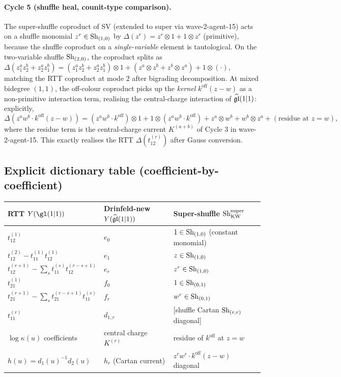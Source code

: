 \paragraph{Cycle 5 (shuffle heal, counit-type comparison).} The
super-shuffle coproduct of SV (extended to super via wave-2-agent-15)
acts on a shuffle monomial $z^r \in \mathrm{Sh}_{(1,0)}$ by
$\Delta(z^r) = z^r \otimes 1 + 1 \otimes z^r$ (primitive), because the
shuffle coproduct on a \emph{single-variable} element is tautological.
On the two-variable shuffle $\mathrm{Sh}_{(2,0)}$, the coproduct splits as
$\Delta(z_1^a z_2^b + z_2^a z_1^b) = (z_1^a z_2^b + z_2^a z_1^b)
\otimes 1 + (z^a \otimes z^b + z^b \otimes z^a) + 1 \otimes (\cdot)$,
matching the RTT coproduct at mode $2$ after bigrading decomposition.
At mixed bidegree $(1,1)$, the off-colour coproduct picks up the
\emph{kernel} $k^{\mathrm{off}}(z-w)$ as a non-primitive interaction
term, realising the central-charge interaction of
$\widehat{\mathfrak{gl}}(1|1)$: explicitly,
\[
  \Delta(z^a w^b \cdot k^{\mathrm{off}}(z-w))
  = (z^a w^b \cdot k^{\mathrm{off}})\otimes 1
  + 1\otimes(z^a w^b\cdot k^{\mathrm{off}})
  + z^a \otimes w^b + w^b\otimes z^a + (\text{residue at }z=w),
\]
where the residue term is the central-charge current $K^{(a+b)}$ of
Cycle 3 in wave-2-agent-15. This exactly realises the RTT
$\Delta(t^{(r)}_{12})$ after Gauss conversion.

\subsection*{Explicit dictionary table (coefficient-by-coefficient)}

\begin{center}
\begin{tabular}{@{}l|l|l@{}}
\textbf{RTT $Y(\gl(1|1))$} & \textbf{Drinfeld-new $Y(\widehat{\mathfrak{gl}}(1|1))$} & \textbf{Super-shuffle $\mathrm{Sh}^{\mathrm{super}}_{\mathrm{KW}}$} \\
\hline
$t^{(1)}_{12}$ & $e_0$ & $1 \in \mathrm{Sh}_{(1,0)}$ (constant monomial) \\
$t^{(2)}_{12} - t^{(1)}_{11}t^{(1)}_{12}$ & $e_1$ & $z \in \mathrm{Sh}_{(1,0)}$ \\
$t^{(r+1)}_{12} - \sum_{s} t^{(s)}_{11}t^{(r-s+1)}_{12}$ & $e_r$ & $z^r \in \mathrm{Sh}_{(1,0)}$ \\
\hline
$t^{(1)}_{21}$ & $f_0$ & $1 \in \mathrm{Sh}_{(0,1)}$ \\
$t^{(r+1)}_{21} - \sum_{s} t^{(r-s+1)}_{21}t^{(s)}_{11}$ & $f_r$ & $w^r \in \mathrm{Sh}_{(0,1)}$ \\
\hline
$t^{(r)}_{11}$ & $d_{1,r}$ & [shuffle Cartan $\mathrm{Sh}_{(r,r)}$ diagonal] \\
$\log\kappa(u)$ coefficients & central charge $K^{(r)}$ & residue of $k^{\mathrm{off}}$ at $z=w$ \\
\hline
$h(u) = d_1(u)^{-1}d_2(u)$ & $h_r$ (Cartan current) & $z^r w^r \cdot k^{\mathrm{off}}(z-w)$ diagonal \\
\end{tabular}
\end{center}

